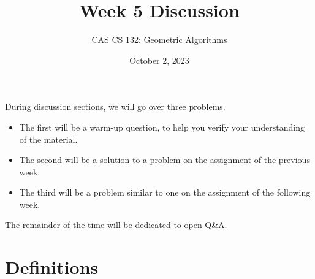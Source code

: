 \documentclass{article}
\title{
  Week 5 Discussion
}
\author{CAS CS 132: Geometric Algorithms}
\date{October 2, 2023}
\theoremstyle{remark}
\begin{document}
\maketitle

\noindent During discussion sections, we will go over three problems.
\begin{itemize}
\item The first will be a warm-up question, to help you verify your understanding of the material.
\item The second will be a solution to a problem on the assignment of the previous week.
\item The third will be a problem similar to one on the assignment of the following week.
\end{itemize}
The remainder of the time will be dedicated to open Q\&A.
\pagebreak

\section{Definitions}
\end{document}

